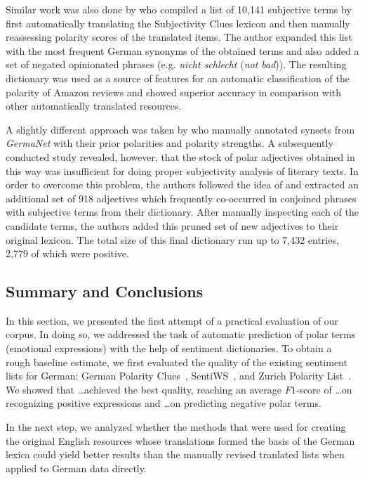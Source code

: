 Similar work was also done by \citet{Waltinger:10} who compiled a list
of 10,141 subjective terms by first automatically translating the
Subjectivity Clues lexicon \citep{Wilson:05} and then manually
reassessing polarity scores of the translated items.  The author
expanded this list with the most frequent German synonyms of the
obtained terms and also added a set of negated opinionated phrases
(e.g. \emph{nicht schlecht} (\emph{not bad})).  The resulting
dictionary was used as a source of features for an automatic
classification of the polarity of Amazon reviews and showed superior
accuracy in comparison with other automatically translated resources.

A slightly different approach was taken by \citet{Clematide:10} who
manually annotated synsets from \emph{GermaNet} \cite{Hamp:97} with
their prior polarities and polarity strengths.  A subsequently
conducted study revealed, however, that the stock of polar adjectives
obtained in this way was insufficient for doing proper subjectivity
analysis of literary texts.  In order to overcome this problem, the
authors followed the idea of \citet{Hatzivassi:97} and extracted an
additional set of 918 adjectives which frequently co-occurred in
conjoined phrases with subjective terms from their dictionary.  After
manually inspecting each of the candidate terms, the authors added
this pruned set of new adjectives to their original lexicon.  The
total size of this final dictionary run up to 7,432 entries, 2,779 of
which were positive.

\subsection{Summary and Conclusions}

In this section, we presented the first attempt of a practical
evaluation of our corpus.  In doing so, we addressed the task of
automatic prediction of polar terms (emotional expressions) with the
help of sentiment dictionaries.  To obtain a rough baseline estimate,
we first evaluated the quality of the existing sentiment lists for
German: German Polarity Clues~\cite{Waltinger:10},
SentiWS~\cite{Remus:10}, and Zurich Polarity List~\cite{Clematide:10}.
We showed that \ldots achieved the best quality, reaching an average
$F1$-score of \ldots on recognizing positive expressions and \ldots on
predicting negative polar terms.

In the next step, we analyzed whether the methods that were used for
creating the original English resources whose translations formed the
basis of the German lexica could yield better results than the
manually revised tranlated lists when applied to German data directly.

